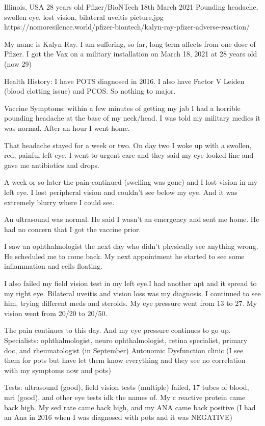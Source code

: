           {Illinois, USA}
          {28 years old}
          {Pfizer/BioNTech}
          {18th March 2021}
          {Pounding headache, swollen eye, lost vision, bilateral uveitis}
          {picture.jpg}
          {https://nomoresilence.world/pfizer-biontech/kalyn-ray-pfizer-adverse-reaction/}
          {

\normalsize

My name is Kalyn Ray. I am suffering, so far, long term affects from one dose of
Pfizer. I got the Vax on a military installation on March 18, 2021 at 28 years
old (now 29)

Health History: I have POTS diagnosed in 2016. I also have Factor V Leiden
(blood clotting issue) and PCOS. So nothing to major.

Vaccine Symptoms: within a few minutes of getting my jab I had a horrible
pounding headache at the base of my neck/head. I was told my military medics it
was normal. After an hour I went home.

That headache stayed for a week or two. On day two I woke up with a swollen,
red, painful left eye. I went to urgent care and they said my eye looked fine
and gave me antibiotics and drops.

A week or so later the pain continued (swelling was gone) and I lost vision in
my left eye. I lost peripheral vision and couldn’t see below my eye. And it was
extremely blurry where I could see.

An ultrasound was normal. He said I wasn’t an emergency and sent me home. He had
no concern that I got the vaccine prior.

I saw an ophthalmologist the next day who didn’t physically see anything
wrong. He scheduled me to come back. My next appointment he started to see some
inflammation and cells floating.

I also failed my field vision test in my left eye.I had another apt and it
spread to my right eye. Bilateral uveitis and vision loss was my diagnosis. I
continued to see him, trying different meds and steroids. My eye pressure went
from 13 to 27. My vision went from 20/20 to 20/50.

The pain continues to this day. And my eye pressure continues to go
up. Specialists: ophthalmologist, neuro ophthalmologist, retina specialist,
primary doc, and rheumatologist (in September) Autonomic Dysfunction clinic (I
see them for pots but have let them know everything and they see no correlation
with my symptoms now and pots)

Tests: ultrasound (good), field vision tests (multiple) failed, 17 tubes of
blood, mri (good), and other eye tests idk the names of. My c reactive protein
came back high. My sed rate came back high, and my ANA came back positive (I had
an Ana in 2016 when I was diagnosed with pots and it was NEGATIVE)

}

